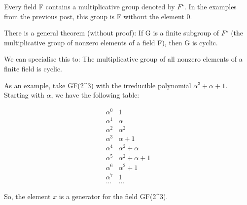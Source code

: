 Every field F contains a multiplicative group denoted by \(F^\star\). In
the examples from the previous post, this group is F without the element
0.

There is a general theorem (without proof): If G is a finite subgroup of
\(F^\star\) (the multiplicative group of nonzero elements of a field F),
then G is cyclic.

We can specialise this to: The multiplicative group of all nonzero
elements of a finite field is cyclic.

As an example, take GF(2\^{}3) with the irreducible polynomial
\(\alpha^3 + \alpha + 1\). Starting with \(\alpha\), we have the
following table:

\[
\begin{array}{cc}
\alpha^0 & 1 \\
\alpha^1 & \alpha \\
\alpha^2 & \alpha^2 \\
\alpha^3 & \alpha +1 \\
\alpha^4 & \alpha^2 + \alpha \\
\alpha^5 & \alpha^2 + \alpha + 1 \\
\alpha^6 & \alpha^2 + 1 \\
\alpha^7 & 1 \\
... & ...
\end{array}
\]

So, the element \(x\) is a generator for the field GF(2\^{}3).
